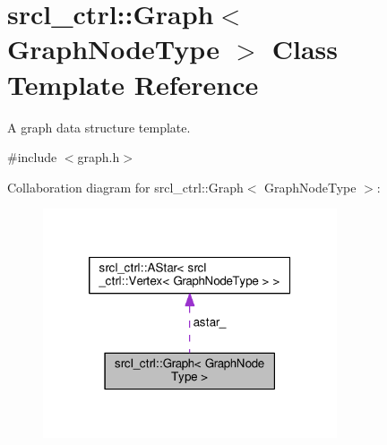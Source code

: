 \hypertarget{classsrcl__ctrl_1_1Graph}{\section{srcl\-\_\-ctrl\-:\-:Graph$<$ Graph\-Node\-Type $>$ Class Template Reference}
\label{classsrcl__ctrl_1_1Graph}
}


A graph data structure template.  




{\ttfamily \#include $<$graph.\-h$>$}



Collaboration diagram for srcl\-\_\-ctrl\-:\-:Graph$<$ Graph\-Node\-Type $>$\-:\nopagebreak
\begin{figure}[H]
\begin{center}
\leavevmode
\includegraphics[width=246pt]{classsrcl__ctrl_1_1Graph__coll__graph}
\end{center}
\end{figure}
